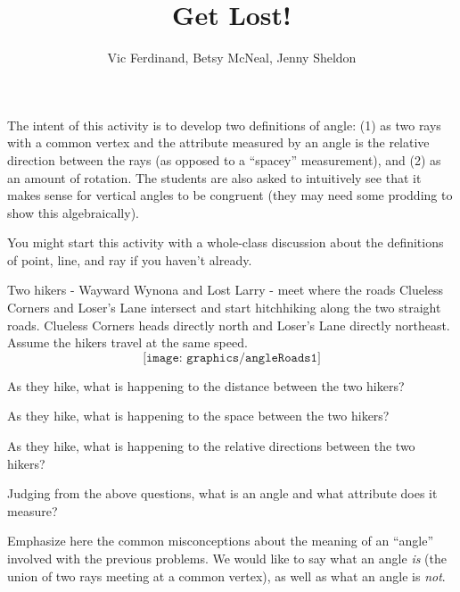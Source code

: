 \documentclass{ximera}
\title{Get Lost!}
\author{Vic Ferdinand, Betsy McNeal, Jenny Sheldon}
\begin{document}
\begin{abstract}
\end{abstract}
\maketitle

\begin{instructorIntro}
The intent of this activity is to develop two definitions of angle:
(1) as two rays with a common vertex and the attribute measured by an angle is the relative direction between the rays (as opposed to a ``spacey'' measurement), and (2) as an amount of rotation.  The students are also asked to intuitively see that it makes sense for vertical angles to be congruent (they may need some prodding to show this algebraically).

You might start this activity with a whole-class discussion about the definitions of point, line, and ray if you haven't already.
\end{instructorIntro}

Two hikers - Wayward Wynona and Lost Larry - meet where the roads Clueless Corners and Loser's Lane intersect and start hitchhiking along the two straight roads.  Clueless Corners heads directly north and Loser’s Lane directly northeast.  Assume the hikers travel at the same speed.
\[
\texttt{[image: graphics/angleRoads1]}
\]

\begin{problem}
As they hike, what is happening to the distance between the two hikers?

\end{problem}

\begin{problem}
As they hike, what is happening to the space between the two hikers?

\end{problem}

\begin{problem}
As they hike, what is happening to the relative directions between the two hikers?

\end{problem}

\begin{problem}
Judging from the above questions, what is an angle and what attribute does it measure?

\begin{instructorNotes}
Emphasize here the common misconceptions about the meaning of an ``angle'' involved with the previous problems.  We would like to say what an angle {\em is} (the union of two rays meeting at a common vertex), as well as what an angle is {\em not}.
\end{instructorNotes}
\end{problem}
\end{document}
